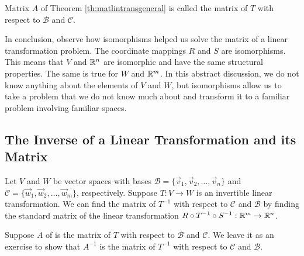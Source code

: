 \documentclass{ximera}
\begin{document}
\begin{definition}\label{def:matlintransgenera}
Matrix $A$ of Theorem \ref{th:matlintransgeneral} is called the matrix of $T$ with respect to $\mathcal{B}$ and $\mathcal{C}$.
\end{definition}

In conclusion, observe how isomorphisms helped us solve the matrix of a linear transformation problem.  The coordinate mappings $R$ and $S$ are isomorphisms.  This means that $V$ and $\mathbb{R}^n$ are isomorphic and have the same structural properties.  The same is true for $W$ and $\mathbb{R}^m$.  In this abstract discussion, we do not know anything about the elements of $V$ and $W$, but isomorphisms allow us to take a problem that we do not know much about and transform it to a familiar problem involving familiar spaces.

\subsection*{The Inverse of a Linear Transformation and its Matrix}

Let $V$ and $W$ be vector spaces with bases $\mathcal{B}=\{\vec{v}_1, \vec{v}_2,\ldots ,\vec{v}_n\}$ and $\mathcal{C}=\{\vec{w}_1, \vec{w}_2,\ldots ,\vec{w}_m\}$, respectively.   Suppose $T:V\rightarrow W$ is an invertible linear transformation.  We can find the matrix of $T^{-1}$ with respect to $\mathcal{C}$ and $\mathcal{B}$ by finding the standard matrix of the linear transformation $R\circ T^{-1}\circ S^{-1}:\mathbb{R}^m\rightarrow \mathbb{R}^n$.

\begin{center}
\end{center}

Suppose $A$ of  is  the matrix of $T$ with respect to $\mathcal{B}$ and $\mathcal{C}$.  We leave it as an exercise to show that $A^{-1}$ is the matrix of $T^{-1}$ with respect to $\mathcal{C}$ and $\mathcal{B}$.
\end{document}
